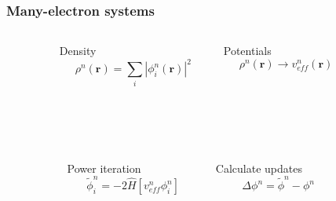 \documentclass[mathserif, 10pt]{beamer}
\begin{document}
\begin{frame}
    \frametitle{Many-electron systems}
    \begin{columns}
    \begin{column}[b]{0.1\textwidth}
    \ \\
    \end{column}
    \begin{column}[b]{0.4\textwidth}
    \centering
    Density
    \begin{equation}
	\nonumber
	\rho^n(\boldsymbol{r}) = \sum_i |\phi_i^n(\boldsymbol{r})|^2
    \end{equation}
    \end{column}
    \begin{column}[b]{0.4\textwidth}
    \centering
    Potentials
    \begin{equation}   
	\nonumber
	\rho^n(\boldsymbol{r}) \rightarrow v_{eff}^n(\boldsymbol{r})
    \end{equation}
    \end{column}
    \begin{column}[b]{0.1\textwidth}
    \ \\
    \end{column}
    \end{columns}
    \ \\
    \ \\
    \begin{columns}
    \begin{column}[b]{0.1\textwidth}
    \ \\
    \end{column}
    \begin{column}[b]{0.4\textwidth}
    \centering
    Power iteration
    \begin{equation}
	\nonumber
	\tilde{\phi}_i^n = -2\hat{H}\left[v_{eff}^n\phi_i^n\right]
    \end{equation}
    \end{column}
    \begin{column}[b]{0.4\textwidth}
    \centering
    Calculate updates
    \begin{equation}
	\nonumber
	\Delta\phi^n = \tilde{\phi}^n - \phi^n
    \end{equation}
    \end{column}
    \begin{column}[b]{0.1\textwidth}
    \ \\
    \end{column}
    \end{columns}
    \ \\

\end{frame}
\end{document}
